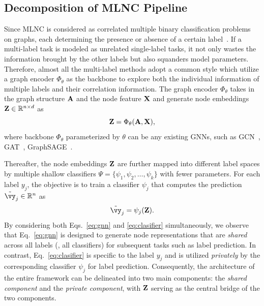 \subsection{Decomposition of MLNC Pipeline} \label{sec:pipe}
Since MLNC is considered as correlated multiple binary classification problems on graphs, each determining the presence or absence of a certain label~\citep{zhang2013review}.
If a multi-label task is modeled as unrelated single-label tasks, it not only wastes the information brought by the other labels but also squanders model parameters. 
Therefore, almost all the multi-label methods adopt a common style which utilize a graph encoder $\Phi_{\theta}$ as the backbone to explore both the individual information of multiple labels and their correlation information. 
The graph encoder $\Phi_{\theta}$ takes in the graph structure $\mathbf{A}$ and the node feature $\mathbf{X}$ and generate node embeddings $\mathbf{Z} \in \mathbb{R}^{n \times d}$ as
\begin{equation} \label{eq:gnn}
    \mathbf{Z} = \Phi_{\theta}(\mathbf{A}, \mathbf{X}),
\end{equation}
where backbone $\Phi_{\theta}$ parameterized by $\theta$ can be any existing GNNs, such as GCN~\citep{kipf2017semisupervised}, GAT~\citep{2017Graph}, GraphSAGE~\citep{hamilton2017inductive}.

Thereafter, the node embeddings $\mathbf{Z}$ are further mapped into different label spaces by multiple shallow classifiers $\Psi = \{ \psi_1, \psi_2, \ldots, \psi_k \}$ with fewer parameters. 
For each label $y_j$, the objective is to train a classifier $\psi_j$ that computes the prediction $\tilde{\vy}_j\in\mathbb{R}^{n}$ as 
\begin{equation} \label{eq:clasifier}
    \tilde{\vy}_j =  \psi_j(\v{Z}).
\end{equation}
By considering both Eqs.~\ref{eq:gnn} and \ref{eq:clasifier} simultaneously, we observe that  Eq.~\ref{eq:gnn} is designed to generate node representations that are \emph{shared} across all labels (\ie, all classifiers) for subsequent tasks such as label prediction. In contrast, Eq.~\ref{eq:clasifier} is specific to the label $y_j$ and is utilized \emph{privately} by the corresponding classifier $\psi_j$ for label prediction. Consequently, the architecture of the entire framework can be delineated into two main components: the \emph{shared component} and the \emph{private component}, with $\mathbf{Z}$ serving as the central bridge of the two components.



